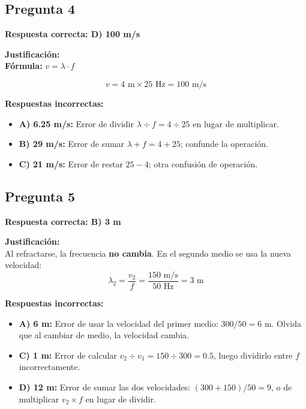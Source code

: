 \begin{respuestabox}
\subsection*{Pregunta 4}
\textcolor{verdecorrecto}{\textbf{Respuesta correcta: D) 100 m/s}}

\textbf{Justificación:}\\
\textbf{Fórmula:} $v = \lambda \cdot f$

$$v = 4 \text{ m} \times 25 \text{ Hz} = 100 \text{ m/s}$$

\textbf{Respuestas incorrectas:}
\begin{itemize}
    \item \textbf{A) 6.25 m/s:} Error de dividir $\lambda \div f = 4 \div 25$ en lugar de multiplicar.
    \item \textbf{B) 29 m/s:} Error de sumar $\lambda + f = 4 + 25$; confunde la operación.
    \item \textbf{C) 21 m/s:} Error de restar $25 - 4$; otra confusión de operación.
\end{itemize}
\end{respuestabox}

\begin{respuestabox}
\subsection*{Pregunta 5}
\textcolor{verdecorrecto}{\textbf{Respuesta correcta: B) 3 m}}

\textbf{Justificación:}\\
Al refractarse, la frecuencia \textbf{no cambia}. En el segundo medio se usa la nueva velocidad:
$$\lambda_2 = \frac{v_2}{f} = \frac{150 \text{ m/s}}{50 \text{ Hz}} = 3 \text{ m}$$

\textbf{Respuestas incorrectas:}
\begin{itemize}
    \item \textbf{A) 6 m:} Error de usar la velocidad del primer medio: $300/50 = 6$ m. Olvida que al cambiar de medio, la velocidad cambia.
    \item \textbf{C) 1 m:} Error de calcular $v_2 \div v_1 = 150 \div 300 = 0.5$, luego dividirlo entre $f$ incorrectamente.
    \item \textbf{D) 12 m:} Error de sumar las dos velocidades: $(300 + 150)/50 = 9$, o de multiplicar $v_2 \times f$ en lugar de dividir.
\end{itemize}
\end{respuestabox}

